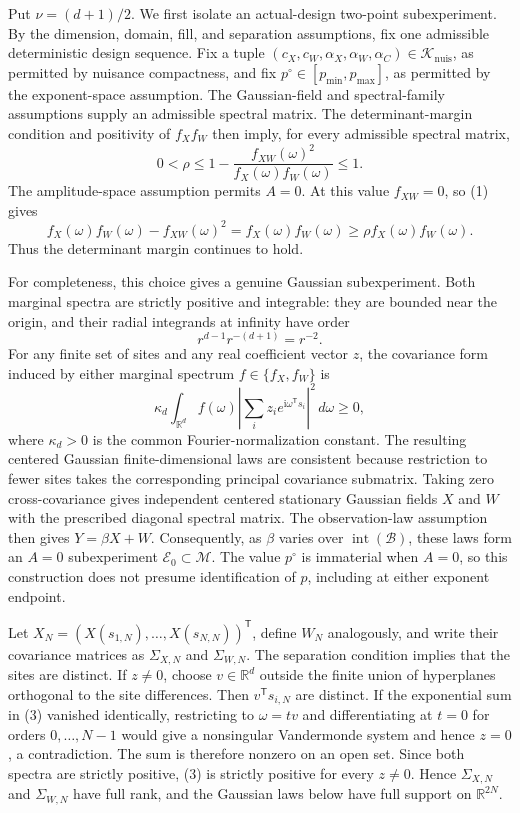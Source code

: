 Put \(\nu=(d+1)/2\).  We first isolate an actual-design two-point subexperiment.  By the dimension, domain, fill, and separation assumptions, fix one admissible deterministic design sequence.  Fix a tuple \((c_X,c_W,\alpha_X,\alpha_W,\alpha_C)\in\mathcal K_{\mathrm{nuis}}\), as permitted by nuisance compactness, and fix \(p^\circ\in[p_{\min},p_{\max}]\), as permitted by the exponent-space assumption.  The Gaussian-field and spectral-family assumptions supply an admissible spectral matrix.  The determinant-margin condition and positivity of \(f_Xf_W\) then imply, for every admissible spectral matrix,
\[
 0<\rho\leq 1-\frac{f_{XW}(\omega)^2}{f_X(\omega)f_W(\omega)}\leq1.
 \tag{1}
\]
The amplitude-space assumption permits \(A=0\).  At this value \(f_{XW}=0\), so (1) gives
\[
 f_X(\omega)f_W(\omega)-f_{XW}(\omega)^2
 =f_X(\omega)f_W(\omega)
 \geq\rho f_X(\omega)f_W(\omega).
 \tag{2}
\]
Thus the determinant margin continues to hold.

For completeness, this choice gives a genuine Gaussian subexperiment.  Both marginal spectra are strictly positive and integrable: they are bounded near the origin, and their radial integrands at infinity have order
\[
 r^{d-1}r^{-(d+1)}=r^{-2}.
\]
For any finite set of sites and any real coefficient vector \(z\), the covariance form induced by either marginal spectrum \(f\in\{f_X,f_W\}\) is
\[
 \kappa_d\int_{\mathbb R^d}f(\omega)
 \left|\sum_i z_i e^{\mathrm i\omega^{\mathsf T}s_i}\right|^2\,d\omega\geq0,
 \tag{3}
\]
where \(\kappa_d>0\) is the common Fourier-normalization constant.  The resulting centered Gaussian finite-dimensional laws are consistent because restriction to fewer sites takes the corresponding principal covariance submatrix.  Taking zero cross-covariance gives independent centered stationary Gaussian fields \(X\) and \(W\) with the prescribed diagonal spectral matrix.  The observation-law assumption then gives \(Y=\beta X+W\).  Consequently, as \(\beta\) varies over \(\operatorname{int}(\mathcal B)\), these laws form an \(A=0\) subexperiment \(\mathcal E_0\subset\mathcal M\).  The value \(p^\circ\) is immaterial when \(A=0\), so this construction does not presume identification of \(p\), including at either exponent endpoint.

Let \(X_N=(X(s_{1,N}),\ldots,X(s_{N,N}))^{\mathsf T}\), define \(W_N\) analogously, and write their covariance matrices as \(\Sigma_{X,N}\) and \(\Sigma_{W,N}\).  The separation condition implies that the sites are distinct.  If \(z\ne0\), choose \(v\in\mathbb R^d\) outside the finite union of hyperplanes orthogonal to the site differences.  Then \(v^{\mathsf T}s_{i,N}\) are distinct.  If the exponential sum in (3) vanished identically, restricting to \(\omega=tv\) and differentiating at \(t=0\) for orders \(0,\ldots,N-1\) would give a nonsingular Vandermonde system and hence \(z=0\), a contradiction.  The sum is therefore nonzero on an open set.  Since both spectra are strictly positive, (3) is strictly positive for every \(z\ne0\).  Hence \(\Sigma_{X,N}\) and \(\Sigma_{W,N}\) have full rank, and the Gaussian laws below have full support on \(\mathbb R^{2N}\).

